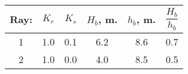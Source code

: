 \begin{tabular}{cccccc}
Ray: & $K_{r}$ & $K_{s}$ & $H_{b}$, m. & $h_{b}$, m. & $\dfrac{H_{b}}{h_{b}}$ \\
\hline
1 & 1.0 & 0.1 & 6.2 & 8.6 & 0.7 \\
2 & 1.0 & 0.0 & 4.0 & 8.5 & 0.5 \\
\hline
\end{tabular}
